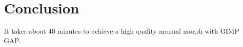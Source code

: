 \section{Conclusion}

It takes about 40 minutes to achieve a high quality manual morph with GIMP GAP. 